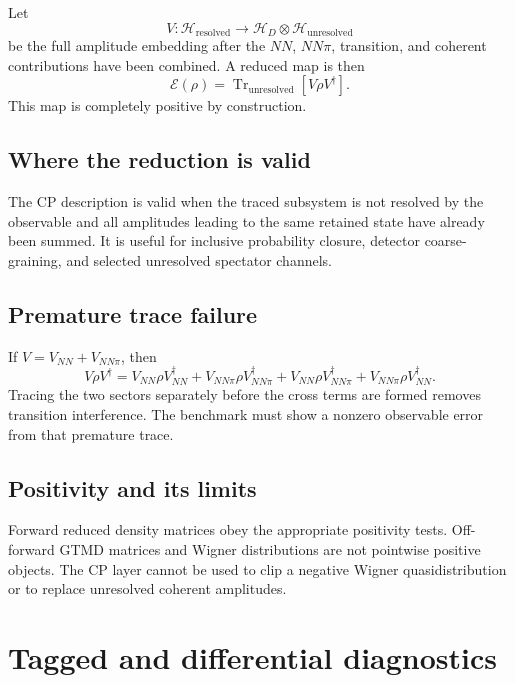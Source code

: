 \documentclass[11pt]{article}
\newcommand{\Tr}{\operatorname{Tr}}
\newcommand{\Hil}{\mathcal H}
\newcommand{\cE}{\mathcal E}
\begin{document}
Let
\begin{equation}
 V:
 \Hil_{\mathrm{resolved}}
 \longrightarrow
 \Hil_D\otimes\Hil_{\mathrm{unresolved}}
 \label{eq:amplitude-embedding}
\end{equation}
be the full amplitude embedding after the \(NN\), \(NN\pi\), transition, and
coherent contributions have been combined.  A reduced map is then
\begin{equation}
 \cE(\rho)
 =\Tr_{\mathrm{unresolved}}
 \left[V\rho V^{\dagger}\right].
 \label{eq:derived-cp-map}
\end{equation}
This map is completely positive by construction.

\subsection{Where the reduction is valid}

The CP description is valid when the traced subsystem is not resolved by the
observable and all amplitudes leading to the same retained state have already
been summed.  It is useful for inclusive probability closure, detector
coarse-graining, and selected unresolved spectator channels.

\subsection{Premature trace failure}

If \(V=V_{NN}+V_{NN\pi}\), then
\begin{equation}
 V\rho V^{\dagger}
 =V_{NN}\rho V_{NN}^{\dagger}
 +V_{NN\pi}\rho V_{NN\pi}^{\dagger}
 +V_{NN}\rho V_{NN\pi}^{\dagger}
 +V_{NN\pi}\rho V_{NN}^{\dagger}.
 \label{eq:coherent-density}
\end{equation}
Tracing the two sectors separately before the cross terms are formed removes
transition interference.  The benchmark must show a nonzero observable error
from that premature trace.

\subsection{Positivity and its limits}

Forward reduced density matrices obey the appropriate positivity tests.
Off-forward GTMD matrices and Wigner distributions are not pointwise positive
objects.  The CP layer cannot be used to clip a negative Wigner
quasidistribution or to replace unresolved coherent amplitudes.

\section{Tagged and differential diagnostics}
\label{sec:tagged}
\end{document}
